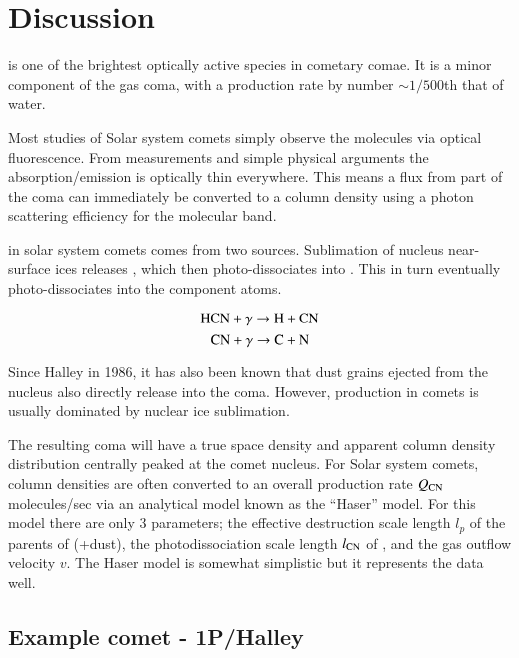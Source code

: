 \documentclass{aa}
\begin{document}
\section{Discussion}\label{sec:discuss}


 is one of the brightest optically active species in cometary comae.
%
It is a minor component of the gas coma, with a production rate by number $\sim 1/500$th that of water. 

Most studies of Solar system comets simply observe the  molecules via optical fluorescence.
%
From measurements and simple physical arguments the  absorption/emission is optically thin everywhere.
%
This means a flux from part of the coma can immediately be converted to a column density using a photon scattering efficiency for the molecular band.

 in solar system comets comes from two sources.
%
Sublimation of nucleus near-surface ices releases , which then photo-dissociates into .
%
This in turn eventually photo-dissociates into the component atoms.

$$\ce{HCN} +\gamma \rightarrow \ce{H}+\ce{CN}$$
$$\ce{CN} + \gamma \rightarrow \ce{C}+\ce{N}$$

Since Halley in 1986, it has also been known that dust grains ejected from the nucleus also directly release  into the coma.
%
However,  production in comets is usually dominated by nuclear ice sublimation.

The resulting  coma will have a true space density and apparent column density distribution centrally peaked at the comet nucleus.
%
For Solar system comets, column densities are often converted to an overall production rate $Q_{\ce{CN}}$ molecules/sec via an analytical model known as the ``Haser'' model.
%
For this model there are only 3 parameters; the effective destruction scale length $l_p$ of the parents of  (+dust), the photodissociation scale length $l_{\ce{CN}}$ of , and the gas outflow velocity $v$.
%
The Haser model is somewhat simplistic but it represents the data well.

\subsection{Example comet - 1P/Halley}
\end{document}
